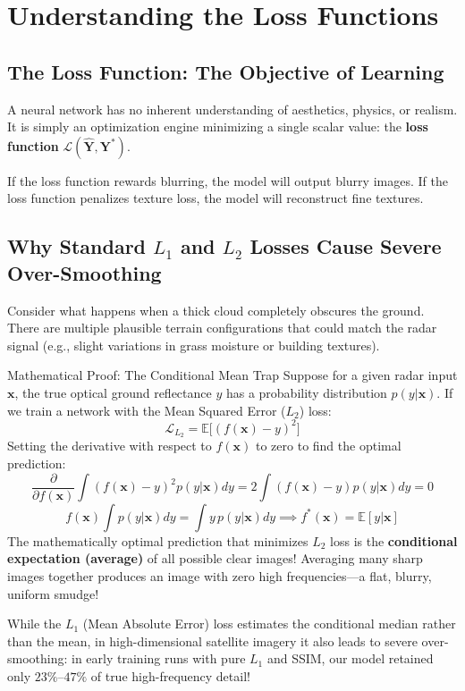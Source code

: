 \chapter{Understanding the Loss Functions}
\label{chap:ch12}

\section{The Loss Function: The Objective of Learning}
A neural network has no inherent understanding of aesthetics, physics, or realism. It is simply an optimization engine minimizing a single scalar value: the \textbf{loss function} $\mathcal{L}(\hat{\mathbf{Y}}, \mathbf{Y}^*)$.

If the loss function rewards blurring, the model will output blurry images. If the loss function penalizes texture loss, the model will reconstruct fine textures.

\section{Why Standard $L_1$ and $L_2$ Losses Cause Severe Over-Smoothing}
Consider what happens when a thick cloud completely obscures the ground. There are multiple plausible terrain configurations that could match the radar signal (e.g., slight variations in grass moisture or building textures).

\begin{mathbox}{Mathematical Proof: The Conditional Mean Trap}
Suppose for a given radar input $\mathbf{x}$, the true optical ground reflectance $y$ has a probability distribution $p(y|\mathbf{x})$.
If we train a network with the Mean Squared Error ($L_2$) loss:
\[
\mathcal{L}_{L_2} = \mathbb{E}\big[ (f(\mathbf{x}) - y)^2 \big]
\]
Setting the derivative with respect to $f(\mathbf{x})$ to zero to find the optimal prediction:
\[
\frac{\partial}{\partial f(\mathbf{x})} \int (f(\mathbf{x}) - y)^2 p(y|\mathbf{x}) dy = 2 \int (f(\mathbf{x}) - y) p(y|\mathbf{x}) dy = 0
\]
\[
f(\mathbf{x}) \int p(y|\mathbf{x}) dy = \int y \, p(y|\mathbf{x}) dy \implies f^*(\mathbf{x}) = \mathbb{E}[y | \mathbf{x}]
\]
The mathematically optimal prediction that minimizes $L_2$ loss is the \textbf{conditional expectation (average)} of all possible clear images! 
Averaging many sharp images together produces an image with zero high frequencies---a flat, blurry, uniform smudge!
\end{mathbox}

While the $L_1$ (Mean Absolute Error) loss estimates the conditional median rather than the mean, in high-dimensional satellite imagery it also leads to severe over-smoothing: in early training runs with pure $L_1$ and SSIM, our model retained only $23\%\text{--}47\%$ of true high-frequency detail!

